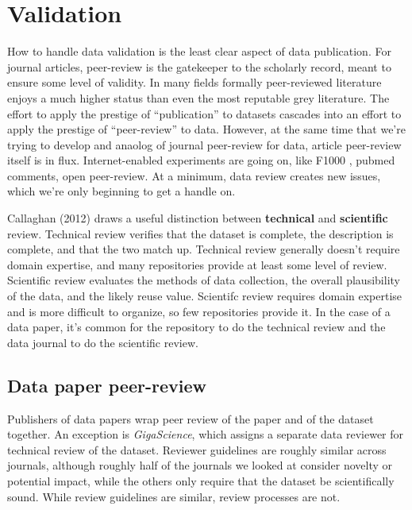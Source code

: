 \documentclass[10pt,twocolumn]{article}
\begin{document}
\section*{Validation}\label{validation}

How to handle data validation is the least clear aspect of data publication.
For journal articles, peer-review is the gatekeeper to the scholarly record, meant to ensure some level of validity.
In many fields formally peer-reviewed literature enjoys a much higher status than even the most reputable grey literature.
The effort to apply the prestige of ``publication'' to datasets cascades into an effort to apply the prestige of ``peer-review'' to data.
However, at the same time that we're trying to develop and anaolog of journal peer-review for data, article peer-review itself is in flux.
Internet-enabled experiments are going on, like F1000 , pubmed comments, open peer-review.
At a minimum, data review creates new issues, which we're only beginning to get a handle on.

Callaghan (2012)\cite{sarah_callaghan_making_2012} draws a useful distinction between \textbf{technical} and \textbf{scientific} review. 
Technical review verifies that the dataset is complete, the description is complete, and that the two match up.  
Technical review generally doesn't require domain expertise, and many repositories provide at least some level of review. 
Scientific review evaluates the methods of data collection, the overall plausibility of the data, and the likely reuse value. 
Scientifc review requires domain expertise and is more difficult to organize, so few repositories provide it.
In the case of a data paper, it's common for the repository to do the technical review and the data journal to do the scientific review.

\subsection*{Data paper peer-review}

Publishers of data papers wrap peer review of the paper and of the dataset together. 
An exception is \emph{GigaScience}, which assigns a separate data reviewer for technical review of the dataset. 
Reviewer guidelines are roughly similar across journals, although roughly half of the journals we looked at consider novelty or potential impact, while the others only require that the dataset be scientifically sound.
While review guidelines are similar, review processes are not. 
\end{document}
